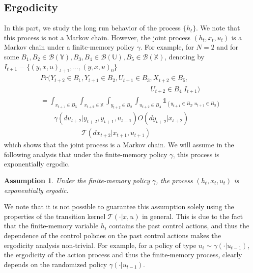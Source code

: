 \documentclass[letterpaper, 10 pt, conference]{ieeeconf}  %
\newtheorem{assumption}{Assumption}
\theoremstyle{definition}
\theoremstyle{remark}
\begin{document}
\subsection{Ergodicity} In this part, we study the long run behavior of the process $\{h_t\}$. We note that this process is not a Markov chain. However, the joint process $(h_t,x_{t},u_t)$ is a Markov chain under a finite-memory policy $\gamma$. For example, for $N=2$ and for some $B_1, B_2 \in  \mathcal{B}(\mathds{Y}), B_3,B_4 \in \mathcal{B}(\mathds{U}), B_5 \in \mathcal{B}(\mathds{X}) $, denoting by $I_{t+1} = \{(y,x,u)_ {t+1},\dots,(y,x,u)_{0}\}$
\begin{align*}
&Pr({Y}_{t+2} \in B_1,{Y}_{t+1} \in B_2, U_{t+1} \in B_3, X_{t+2}\in B_5,\\
&\qquad\qquad\qquad\qquad\qquad\qquad\qquad\qquad   {U}_{t+2}\in B_4 | I_{t+1} )\\
&= \int_{x_{t+1}\in B_5}\int_{x_{t+2}\in\mathds{X}} \int_{y_{t+2}\in B_2} \int_{u_{t+2}\in B_4}\mathds{1}_{(y_{t+1} \in B_2, u_{t+1}\in B_3)} \\
&  \qquad\gamma(du_{t+2}|y_{t+2},y_{t+1},u_{t+1})O(dy_{t+2}|x_{t+2})\\
&\qquad\qquad\qquad  \mathcal{T}(dx_{t+2}|x_{t+1},u_{t+1})
\end{align*}
which shows that the joint process is a Markov chain. We will assume in the following analysis that under the finite-memory policy $\gamma$, this process is exponentially ergodic.
\begin{assumption}\label{erg_assmp}
Under the finite-memory policy $\gamma$, the process $(h_t,x_t,u_t)$ is exponentially ergodic.
\end{assumption}
We note that it is not possible to guarantee this assumption solely using the properties of the transition kernel $\mathcal{T}(\cdot|x,u)$  in general. This is due to the fact that the finite-memory variable $h_t$ contains the past control actions, and thus the dependence of the control policies on the past control actions makes the ergodicity analysis non-trivial.  For example, for a policy of type $u_t\sim\gamma(\cdot|u_{t-1})$, the ergodicity of the action process and thus the finite-memory process, clearly depends on the randomized policy $\gamma(\cdot|u_{t-1})$.
\end{document}
